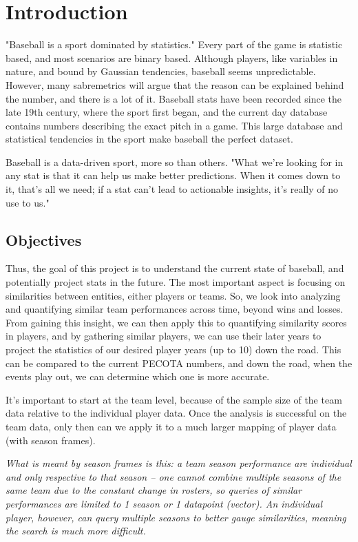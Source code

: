\documentclass[12pt]{article}
\numberwithin{equation}{subsection}
\begin{document}
\section{Introduction}
"Baseball is a sport dominated by statistics."\cite{Bales} Every part of the game is statistic based, and most scenarios are binary based. Although players, like variables in nature, and bound by Gaussian tendencies, baseball seems unpredictable. However, many sabremetrics will argue that the reason can be explained behind the number, and there is a lot of it. Baseball stats have been recorded since the late 19th century, where the sport first began, and the current day database contains numbers describing the exact pitch in a game. This large database and statistical tendencies in the sport make baseball the perfect dataset.

Baseball is a data-driven sport, more so than others. "What we’re looking for in any stat is that it can help us make better predictions. When it comes down to it, that’s all we need; if a stat can’t lead to actionable insights, it’s really of no use to us."\cite{Bales}

\subsection{Objectives}
Thus, the goal of this project is to understand the current state of baseball, and potentially project stats in the future. The most important aspect is focusing on similarities between entities, either players or teams. So, we look into analyzing and quantifying similar team performances across time, beyond wins and losses. From gaining this insight, we can then apply this to quantifying similarity scores in players, and by gathering similar players, we can use their later years to project the statistics of our desired player years (up to 10) down the road. This can be compared to the current PECOTA numbers, and down the road, when the events play out, we can determine which one is more accurate.

It's important to start at the team level, because of the sample size of the team data relative to the individual player data. Once the analysis is successful on the team data, only then can we apply it to a much larger mapping of player data (with season frames).

\textit{What is meant by season frames is this: a team season performance are individual and only respective to that season -- one cannot combine multiple seasons of the same team due to the constant change in rosters, so queries of similar performances are limited to 1 season or 1 datapoint (vector). An individual player, however, can query multiple seasons to better gauge similarities, meaning the search is much more difficult.}
\end{document}
